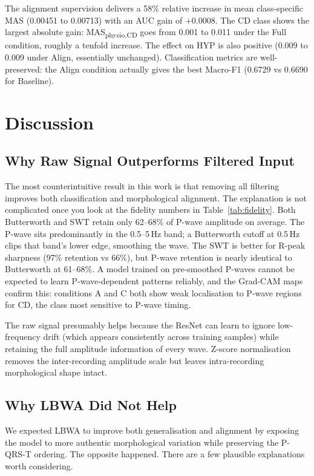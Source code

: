 \documentclass{article}
\begin{document}
The alignment supervision delivers a 58\% relative increase in
mean class-specific MAS (0.00451 to 0.00713) with an AUC gain of
$+0.0008$. The CD class shows the largest absolute gain:
MAS\textsubscript{physio,CD} goes from 0.001 to 0.011 under the
Full condition, roughly a tenfold increase. The effect on HYP is
also positive (0.009 to 0.009 under Align, essentially unchanged).
Classification metrics are well-preserved: the Align condition
actually gives the best Macro-F1 (0.6729 vs 0.6690 for Baseline).

\section{Discussion}

\subsection{Why Raw Signal Outperforms Filtered Input}

The most counterintuitive result in this work is that removing all
filtering improves both classification and morphological alignment.
The explanation is not complicated once you look at the fidelity
numbers in Table~\ref{tab:fidelity}. Both Butterworth and SWT retain
only 62--68\% of P-wave amplitude on average. The P-wave sits
predominantly in the 0.5--5\,Hz band; a Butterworth cutoff at 0.5\,Hz
clips that band's lower edge, smoothing the wave. The SWT is better
for R-peak sharpness (97\% retention vs 66\%), but P-wave retention
is nearly identical to Butterworth at 61--68\%. A model trained on
pre-smoothed P-waves cannot be expected to learn P-wave-dependent
patterns reliably, and the Grad-CAM maps confirm this: conditions A
and C both show weak localisation to P-wave regions for CD, the class
most sensitive to P-wave timing.

The raw signal presumably helps because the ResNet can learn to ignore
low-frequency drift (which appears consistently across training
samples) while retaining the full amplitude information of every wave.
Z-score normalisation removes the inter-recording amplitude scale but
leaves intra-recording morphological shape intact.

\subsection{Why LBWA Did Not Help}

We expected LBWA to improve both generalisation and alignment by
exposing the model to more authentic morphological variation while
preserving the P-QRS-T ordering. The opposite happened. There are
a few plausible explanations worth considering.
\end{document}
